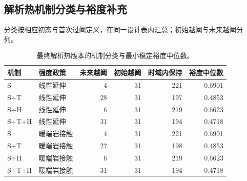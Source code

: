 \subsection{解析热机制分类与裕度补充}
分类按相应初态与首次过阈定义，在同一设计表内汇总；初始越阈与未来越阈分列。
\begin{table}[htbp]\centering\small\caption{最终解析热版本的机制分类与最小稳定裕度中位数。}\label{tab:app-mechanisms}
\begin{tabular}{llrrrr}\toprule 机制 & 强度政策 & 未来越阈 & 初始越阈 & 时域内保持 & 裕度中位数\\\midrule
S & 线性延伸 & 4 & 31 & 221 & 0.6901\\
S+T & 线性延伸 & 28 & 31 & 197 & 0.4853\\
S+H & 线性延伸 & 6 & 31 & 219 & 0.6623\\
S+T+H & 线性延伸 & 31 & 31 & 194 & 0.4718\\
S & 暖端岩接触 & 4 & 31 & 221 & 0.6901\\
S+T & 暖端岩接触 & 27 & 31 & 198 & 0.4853\\
S+H & 暖端岩接触 & 6 & 31 & 219 & 0.6623\\
S+T+H & 暖端岩接触 & 31 & 31 & 194 & 0.4718\\
\bottomrule\end{tabular}\end{table}

